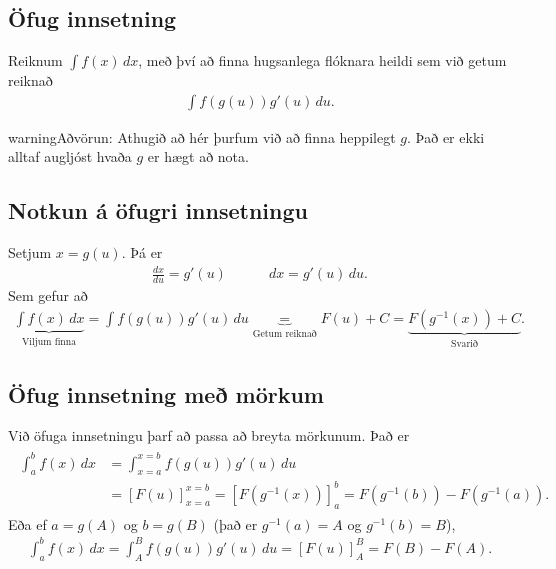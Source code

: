 \documentclass[a4paper,10pt,icelandic]{sphinxmanual}
\begin{document}
\subsection{Öfug innsetning}
\label{kafli06:ofug-innsetning}\label{kafli06:index-10}
Reiknum \(\int f(x)\, dx\), með því að finna hugsanlega flóknara
heildi sem við getum reiknað
\begin{equation*}
\begin{split}\int f(g(u))g'(u)\, du.\end{split}
\end{equation*}
\begin{notice}{warning}{Aðvörun:}
Athugið að hér þurfum við að finna heppilegt \(g\). Það
er ekki alltaf augljóst hvaða \(g\) er hægt að nota.
\end{notice}


\subsection{Notkun á öfugri innsetningu}
\label{kafli06:notkun-a-ofugri-innsetningu}
Setjum \(x=g(u)\). Þá er
\begin{equation*}
\begin{split}\frac{dx}{du}=g'(u)\qquad\quad dx=g'(u)\,du.\end{split}
\end{equation*}
Sem gefur að
\begin{equation*}
\begin{split}\underbrace{\int f(x)\,dx}_{\text{Viljum finna}}  =
\int f(g(u))g'(u)\,du \underbrace{=}_{\text{Getum reiknað}} F(u) + C
= \underbrace{F(g^{-1}(x)) + C}_{\text{Svarið}}.\end{split}
\end{equation*}

\subsection{Öfug innsetning með mörkum}
\label{kafli06:ofug-innsetning-me-morkum}
Við öfuga innsetningu þarf að passa að breyta mörkunum. Það er
\begin{equation*}
\begin{split}\begin{aligned}
\int_a^b f(x)\,dx    &= \int_{x=a}^{x=b} f(g(u))g'(u)\,du  \\
&= [F(u)]_{x=a}^{x=b} = [F(g^{-1}(x))]_a^b = F(g^{-1}(b)) - F(g^{-1}(a)).\end{aligned}\end{split}
\end{equation*}
Eða ef \(a=g(A)\) og \(b=g(B)\) (það er \(g^{-1}(a) = A\) og
\(g^{-1}(b) = B\)),
\begin{equation*}
\begin{split}\int_a^b f(x)\,dx  = \int_A^B f(g(u))g'(u)\,du= [F(u)]_A^B = F(B) - F(A).\end{split}
\end{equation*}
\end{document}
